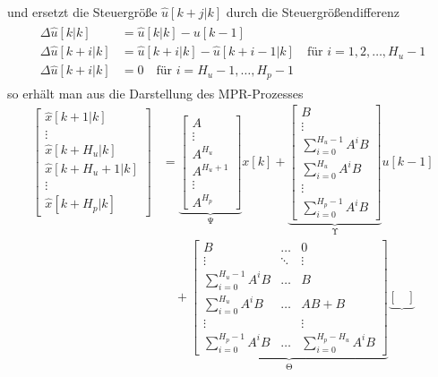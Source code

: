 und ersetzt die Steuergröße $\hat{u}[k+j|k]$ durch die Steuergrößendifferenz
\begin{align}
\begin{split}\label{eqn:kap_4_steuergroessendiff}
	\Delta\hat{u}[k|k] & = \hat{u}[k|k]-u[k-1]\\
	\Delta\hat{u}[k+i|k] & = \hat{u}[k+i|k]-\hat{u}[k+i-1|k]\quad\text{für }i=1,2,\ldots,H_u-1\\
	\Delta\hat{u}[k+i|k] & = 0\quad\text{für }i=H_u-1,\ldots,H_p-1
\end{split}
\end{align}
so erhält man aus  die Darstellung des \ac{MPR}-Prozesses
\begin{align*}
\begin{bmatrix}
\hat{x}[k+1|k]\\
\vdots\\
\hat{x}[k+H_u|k]\\
\hat{x}[k+H_u+1|k]\\
\vdots\\
\hat{x}[k+H_p|k]
\end{bmatrix} & = \underbrace{\begin{bmatrix}
A\\ \vdots\\ A^{H_u}\\ A^{H_u+1}\\ \vdots\\ A^{H_p}
\end{bmatrix}}_{\mathrm{\Psi}}x[k]+\underbrace{\begin{bmatrix}
B\\ \vdots \\ \sum_{i=0}^{H_u-1}A^iB\\ \sum_{i=0}^{H_u}A^iB\\ \vdots \\ \sum_{i=0}^{H_p-1}A^iB
\end{bmatrix}}_{\mathrm{\Upsilon} }u[k-1]\\
&\quad +\underbrace{\begin{bmatrix}
B 						&	\ldots 	& 	0\\
\vdots					&	\ddots	& 	\vdots\\
\sum_{i=0}^{H_u-1}A^iB	& \ldots	& 	B\\
\sum_{i=0}^{H_u}A^iB	& \ldots	& 	AB+B\\
\vdots					&			& 	\vdots\\
\sum_{i=0}^{H_p-1}A^iB	& \ldots	& 	\sum_{i=0}^{H_p-H_u}A^iB
\end{bmatrix}}_{\mathrm{\Theta}} \underbrace{\begin{bmatrix}

\end{bmatrix}}
\end{align*}
